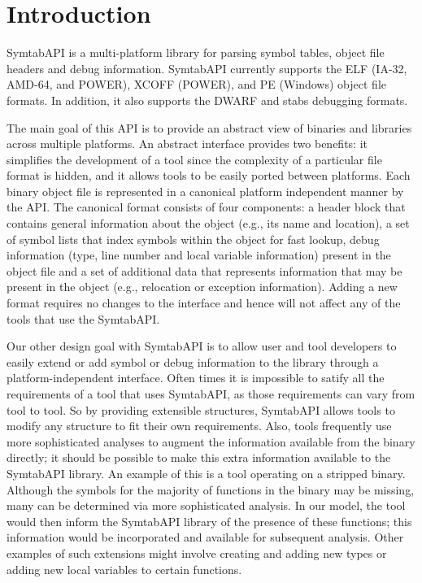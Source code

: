 \section{Introduction}
\label{sec:intro}

SymtabAPI is a multi-platform library for parsing symbol tables,
object file headers and debug information. SymtabAPI currently
supports the ELF (IA-32, AMD-64, and POWER), XCOFF (POWER), and PE
(Windows) object file formats. In addition, it also supports the DWARF
and stabs debugging formats.

The main goal of this API is to provide an abstract view of binaries and libraries across multiple platforms. An abstract interface provides two benefits: it simplifies the development of a tool since the complexity of a particular file format is hidden, and it allows tools to be easily ported between platforms. Each binary object file is represented in a canonical platform independent manner by the API. The canonical format consists of four components: a header block that contains general information about the object (e.g., its name and location), a set of symbol lists that index symbols within the object for fast lookup, debug information (type, line number and local variable information) present in the object file and a set of additional data that represents information that may be present in the object (e.g., relocation or exception information). Adding a new format requires no changes to the interface and hence will not affect any of the tools that use the SymtabAPI. 

Our other design goal with SymtabAPI is to allow user and tool developers to easily extend or add symbol or debug information to the library through a platform-independent interface. Often times it is impossible to satify all the requirements of a tool that uses SymtabAPI, as those requirements can vary from tool to tool. So by providing extensible structures, SymtabAPI allows tools to modify any structure to fit their own requirements. Also, tools frequently use more sophisticated analyses to augment the information available from the binary directly; it should be possible to make this extra information available to the SymtabAPI library. An example of this is a tool operating on a stripped binary. Although the symbols for the majority of functions in the binary may be missing, many can be determined via more sophisticated analysis. In our model, the tool would then inform the SymtabAPI library of the presence of these functions; this information would be incorporated and available for subsequent analysis. Other examples of such extensions might involve creating and adding new types or adding new local variables to certain functions.

